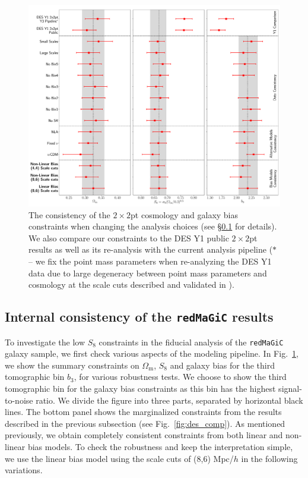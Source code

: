 \documentclass[aps, prd,twocolumn,superscriptaddress,nofootinbib,preprintnumbers]{revtex4-1}
\newcommand{\om}{\ensuremath{\Omega_{\mathrm m}}}
\newcommand{\redmagic}{\texttt{redMaGiC} }
\begin{document}
\begin{figure}
\includegraphics[width=\textwidth]{figs/2x2pt_consistency.pdf}
\caption[]{The consistency of the $2\times2$pt cosmology and galaxy bias constraints when changing the analysis choices (see \S\ref{sec:internal_consistency} for details). We also compare our constraints to the DES Y1 public $2\times2$pt results as well as its re-analysis with the current analysis pipeline ($*$ -- we fix the point mass parameters when re-analyzing the DES Y1 data due to large degeneracy between point mass parameters and cosmology at the scale cuts described and validated in \citet{Abbott_2018}).}
\label{fig:2x2pt_consistency}
\end{figure}


\subsection{Internal consistency of the \redmagic results}
\label{sec:internal_consistency}

To investigate the low $S_8$ constraints in the fiducial analysis of the \redmagic galaxy sample, we first check various aspects of the modeling pipeline. In Fig.~\ref{fig:2x2pt_consistency}, we show the summary constraints on $\om$, $S_8$ and galaxy bias for the third tomographic bin $b_3$, for various robustness tests. We choose to show the third tomographic bin for the galaxy bias constraints as this bin has the highest signal-to-noise ratio. We divide the figure into three parts, separated by horizontal black lines. The bottom panel shows the marginalized constraints from the results described in the previous subsection (see Fig.~\ref{fig:des_comp}). As mentioned previously, we obtain completely consistent constraints from both linear and non-linear bias models. To check the robustness and keep the interpretation simple, we use the linear bias model using the scale cuts of (8,6) Mpc/$h$ in the following variations.  
\end{document}
